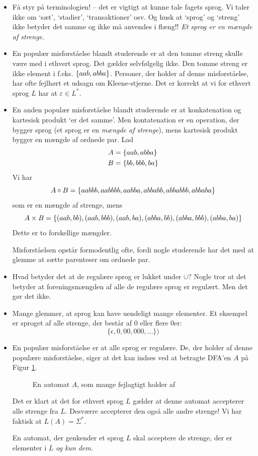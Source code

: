 \documentclass[a4paper,10pt,article]{memoir}
\begin{document}
\begin{itemize}
	\item Få styr på terminologien! -- det er vigtigt at kunne
        tale fagets sprog. Vi taler ikke om `sæt', `stadier',
        `transaktioner' osv. Og husk at `sprog' og `streng' ikke
        betyder det samme og ikke må anvendes i flæng!! \emph{Et sprog
          er en mængde af strenge.}
      \item En populær misforståelse blandt studerende er at den tomme
        streng skulle være med i ethvert sprog. Det gælder
        selvfølgelig ikke. Den tomme streng er ikke element i
        f.eks. $\{  aab, abba \}$. Personer, der holder af denne
        misforståelse, har ofte fejlhørt et udsagn om
        Kleene-stjerne. Det er korrekt at vi for ethvert sprog $L$ har
        at $\varepsilon \in L^{\ast}$.
\item En anden populær misforståelse blandt studerende er at
  konkatenation og kartesisk produkt `er det samme'. Men kontatenation
  er en operation, der bygger sprog (et sprog er en \emph{mængde af
    strenge}), mens kartesisk produkt bygger en mængde af ordnede
  par. Lad 
\begin{align*}
A & = \{  aab, abba \} \\
B & = \{  bb, bbb, ba \}
\end{align*}
%
Vi har
%
\[ A \circ B = \{  aabbb, aabbbb, aabba, abbabb, abbabbb, abbaba \} \]
som er en mængde af strenge, mens
%
\[ A \times B = \{  (aab,bb), (aab,bbb), (aab, ba), (abba,bb),
  (abba,bbb), (abba,ba) \} \]
%
Dette er to forskellige mængder.

Misforståelsen opstår formodentlig ofte, fordi nogle studerende har det med at
glemme at sætte parenteser om ordnede par. 
	\item Hvad betyder det at de regulære sprog er lukket under
          $\cup$? Nogle tror at det betyder at foreningsmængden af
          alle de regulære sprog er regulært. Men det gør det ikke.
	\item Mange glemmer, at sprog kan have uendeligt mange
          elementer. Et eksempel er sproget af alle strenge, der
          består af $0$ eller flere $0$er:
		\[ \{\epsilon, 0, 00, 000, ... \}) \]
	\item En populær misforståelse er at alle sprog er
          regulære. De, der holder af denne populære misforståelse, siger at det
          kan indses ved at betragte DFA'en $A$ på Figur
          \ref{fig:uha}.

\begin{figure}
\begin{center}

\end{center}
\caption{En automat $A$, som mange fejlagtigt holder af}
\label{fig:uha}
\end{figure}
%
Det er klart at det for ethvert sprog $L$ gælder at denne automat
accepterer alle strenge fra $L$. Desværre accepterer den også alle
andre strenge! Vi har faktisk at $L(A)=\Sigma^{\ast} $.

En automat, der genkender et sprog $L$ skal acceptere de strenge, der
er elementer i $L$ \emph{og kun dem}.

\end{itemize}
\end{document}
